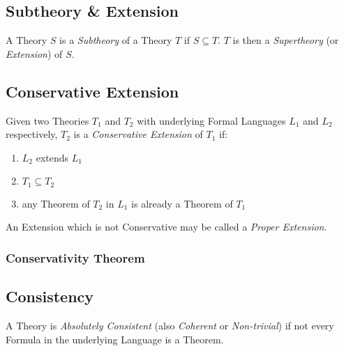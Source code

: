 \subsection{Subtheory \& Extension}\label{sec:subtheory}

A Theory $S$ is a \emph{Subtheory} of a Theory $T$ if $S \subseteq T$.
$T$ is then a \emph{Supertheory} (or \emph{Extension}) of $S$.



\subsection{Conservative Extension}\label{sec:conservative_extension}

Given two Theories $T_1$ and $T_2$ with underlying Formal Languages
$L_1$ and $L_2$ respectively, $T_2$ is a \emph{Conservative Extension}
of $T_1$ if:
\begin{enumerate}
  \item $L_2$ extends $L_1$
  \item $T_1 \subseteq T_2$
  \item any Theorem of $T_2$ in $L_1$ is already a Theorem of $T_1$
\end{enumerate}
An Extension which is not Conservative may be called a \emph{Proper
  Extension}.



\subsubsection{Conservativity Theorem}\label{sec:conservativity_theorem}



\subsection{Consistency}\label{sec:consistency}

A Theory is \emph{Absolutely Consistent} (also \emph{Coherent} or
\emph{Non-trivial}) if not every Formula in the underlying Language is
a Theorem.

